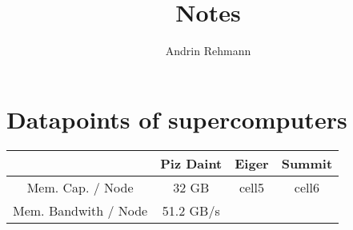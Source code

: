 \documentclass[]{article}
\title{Notes}
\author{Andrin Rehmann}
\begin{document}
\maketitle

\section{Datapoints of supercomputers}

\begin{center}
	\begin{tabular}{ c c c c }
		& Piz Daint & Eiger & Summit \\ 
		\hline
		Mem. Cap. / Node & 32 GB & cell5 & cell6 \\   
		Mem. Bandwith / Node & 51.2 GB/s
	\end{tabular}
\end{center}
\end{document}
